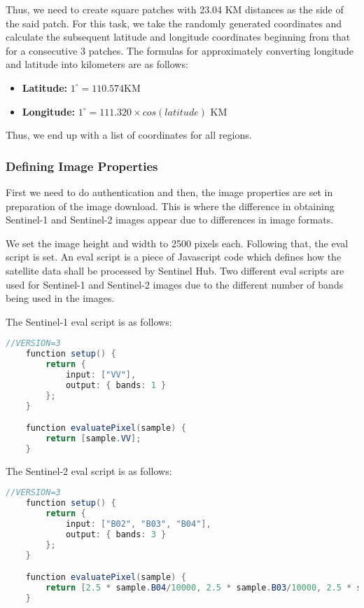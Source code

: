 Thus, we need to create square patches with 23.04 KM distances as the side of the said patch. For this task, we take the randomly generated coordinates and calculate the subsequent latitude and longitude coordinates beginning from that for a consecutive 3 patches. The formulas for approximately converting longitude and latitude into kilometers are as follows:

\begin{itemize}
    \item \textbf{Latitude: } $1^\circ = 110.574$KM
    \item \textbf{Longitude:} $1^\circ = 111.320\times cos(latitude)$ KM
\end{itemize}

Thus, we end up with a list of coordinates for all regions.

\subsubsection{Defining Image Properties}

First we need to do authentication and then, the image properties are set in preparation of the image download. This is where the difference in obtaining Sentinel-1 and Sentinel-2 images appear due to differences in image formats.

We set the image height and width to 2500 pixels each. Following that, the eval script is set. An eval script is a piece of Javascript code which defines how the satellite data shall be processed by Sentinel Hub\cite{evalDoc}. Two different eval scripts are used for Sentinel-1 and Sentinel-2 images due to the different number of bands being used in the images.

The Sentinel-1 eval script is as follows:

\begin{lstlisting}[language=Java]
    //VERSION=3
    function setup() {
        return {
            input: ["VV"],
            output: { bands: 1 }
        };
    }

    function evaluatePixel(sample) {
        return [sample.VV];
    }
\end{lstlisting}

The Sentinel-2 eval script is as follows:

\begin{lstlisting}[language=Java]
    //VERSION=3
    function setup() {
        return {
            input: ["B02", "B03", "B04"],
            output: { bands: 3 }
        };
    }

    function evaluatePixel(sample) {
        return [2.5 * sample.B04/10000, 2.5 * sample.B03/10000, 2.5 * sample.B02/10000];
    }
\end{lstlisting}

